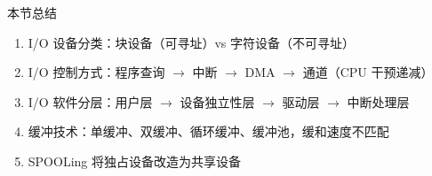 \documentclass[10pt, aspectratio=169]{beamer}
\begin{document}
\begin{frame}{本节总结}
    \begin{enumerate}
        \item I/O 设备分类：块设备（可寻址）vs 字符设备（不可寻址）
        \item I/O 控制方式：程序查询 $\rightarrow$ 中断 $\rightarrow$ DMA $\rightarrow$ 通道（CPU 干预递减）
        \item I/O 软件分层：用户层 $\rightarrow$ 设备独立性层 $\rightarrow$ 驱动层 $\rightarrow$ 中断处理层
        \item 缓冲技术：单缓冲、双缓冲、循环缓冲、缓冲池，缓和速度不匹配
        \item SPOOLing 将独占设备改造为共享设备
    \end{enumerate}
\end{frame}
\end{document}
